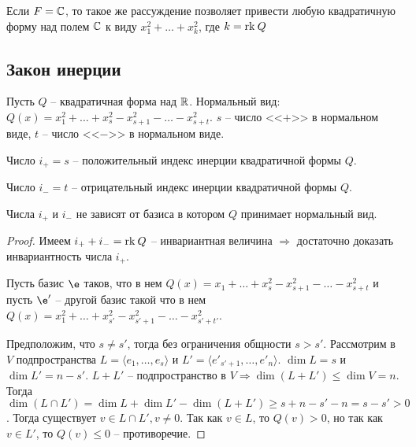 \begin{Note}
  Если $F = \mathbb{C}$, то такое же рассуждение позволяет привести любую квадратичную форму над полем $\mathbb{C}$ к виду $x_1^2 + \ldots + x_k^2$, где $k = \mathrm{rk}\: Q$
\end{Note}

\subsection*{Закон инерции}
%

Пусть $Q$ -- квадратичная форма над $\mathbb{R}$. Нормальный вид: $Q(x) = x_1^2 + \ldots + x_s^2 - x_{s+1}^2 - \ldots - x_{s + t}^2$. $s$ -- число <<$+$>> в нормальном виде, $t$ -- число <<$-$>> в нормальном виде.

\begin{Def}
  Число $i_+ = s$ --  положительный индекс инерции квадратичной формы $Q$.
\end{Def}

\begin{Def}
  Число $i_- = t$ --  отрицательный индекс инерции квадратичной формы $Q$.
\end{Def}

\begin{Theorem}
  Числа $i_+$ и $i_-$ не зависят от базиса в котором $Q$ принимает нормальный вид.
  \begin{proof}
    Имеем $i_+ + i_- = \mathrm{rk}\: Q$ -- инвариантная величина $\Rightarrow$ достаточно доказать инвариантность числа $i_+$.

    Пусть базис $\e$ таков, что в нем $Q(x) = x_1 + \ldots + x_s^2 - x_{s + 1}^2 - \ldots - x_{s + t}^2$ и пусть $\e'$ -- другой базис такой что в нем $Q(x) = x_1^2 + \ldots + x_{s'}^2 - x_{s' + 1}^2 - \ldots - x_{s' + t'}^2$.

    Предположим, что $s \neq s'$, тогда без ограничения общности $s > s'$. Рассмотрим в $V$ подпространства $L = \langle e_1, \ldots, e_s \rangle$ и $L' = \langle e'_{s' + 1}, \ldots, e'_n \rangle$. $\dim L = s$ и $\dim L' = n - s'$. $L + L'$ -- подпространство в $V \Rightarrow \dim(L + L') \leqslant \dim V = n$. Тогда $\dim(L \cap L') = \dim L + \dim L' - \dim(L + L') \geqslant s + n - s' - n = s - s' > 0$. Тогда существует $v \in L \cap L', v \neq 0$. Так как $v \in L$, то $Q(v) > 0$, но так как $v \in L'$, то $Q(v) \leqslant 0$ -- противоречие.
  \end{proof}
\end{Theorem}

